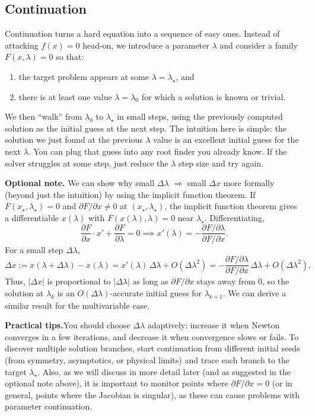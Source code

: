 \subsection{Continuation}

Continuation turns a hard equation into a sequence of easy ones. Instead of attacking $f(x)=0$ head-on, we introduce a parameter $\lambda$ and consider a family $F(x,\lambda)=0$ so that:

\begin{enumerate}
\item the target problem appears at some $\lambda=\lambda_\star$, and
\item there is at least one value $\lambda=\lambda_0$ for which a solution is known or trivial.
\end{enumerate}

We then ``walk'' from $\lambda_0$ to $\lambda_\star$ in small steps, using the previously computed solution as the initial guess at the next step. The intuition here is simple: the solution we just found at the previous $\lambda$ value is an excellent initial guess for the next $\lambda$. You can plug that guess into any root finder you already know. If the solver struggles at some step, just reduce the $\lambda$ step size and try again.

\textbf{Optional note.}\quad
We can show why small $\Delta\lambda$ $\Rightarrow$ small $\Delta x$ more formally (beyond just the intuition) by using the implicit function theorem. If $F(x_\star,\lambda_\star)=0$ and $\partial F/\partial x\neq 0$ at $(x_\star,\lambda_\star)$, the implicit function theorem gives a differentiable $x(\lambda)$ with $F(x(\lambda),\lambda)=0$ near $\lambda_\star$. Differentiating,
\[
\frac{\partial F}{\partial x}\cdot x' + \frac{\partial F}{\partial \lambda} = 0 \implies x'(\lambda) = -\frac{\partial F/\partial \lambda}{\partial F/\partial x}.
\]
For a small step $\Delta\lambda$,
\[
\Delta x := x(\lambda+\Delta\lambda)-x(\lambda)
= x'(\lambda)\,\Delta\lambda + O(\Delta\lambda^2)
= -\frac{\partial F/\partial \lambda}{\partial F/\partial x}\,\Delta\lambda + O(\Delta\lambda^2).
\]
Thus, $|\Delta x|$ is proportional to $|\Delta\lambda|$ as long as $\partial F/\partial x$ stays away from $0$, so the solution at $\lambda_k$ is an $O(\Delta\lambda)$-accurate initial guess for $\lambda_{k+1}$. We can derive a similar result for the multivariable case.

\textbf{Practical tips.}\quad You should choose $\Delta\lambda$ adaptively: increase it when Newton converges in a few iterations, and decrease it when convergence slows or fails. To discover multiple solution branches, start continuation from different initial seeds (from symmetry, asymptotics, or physical limits) and trace each branch to the target $\lambda_\star$. Also, as we will discuss in more detail later (and as suggested in the optional note above), it is important to monitor points where $\partial F/\partial x=0$ (or in general, points where the Jacobian is singular), as these can cause problems with parameter continuation.

